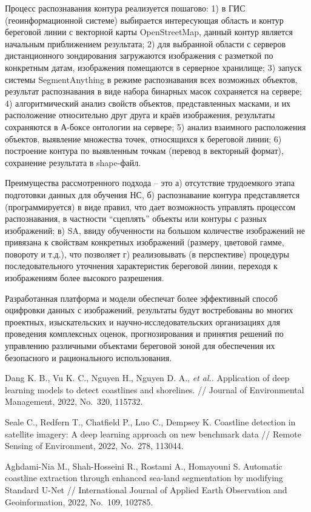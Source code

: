 Процесс распознавания контура реализуется пошагово: 1) в ГИС (геоинформационной системе) выбирается интересующая область и контур береговой линии с векторной карты OpenStreetMap, данный контур является начальным приближением результата; 2) для выбранной области с серверов дистанционного зондирования загружаются изображения с разметкой по конкретным датам, изображения помещаются в серверное хранилище; 3) запуск системы SegmentAnything в режиме распознавания всех возможных объектов, результат распознавания в виде набора бинарных масок сохраняется на сервере; 4) алгоритмический анализ свойств объектов, представленных масками, и их расположение относительно друг друга и краёв изображения, результаты сохраняются в А-боксе онтологии на сервере; 5) анализ взаимного расположения объектов, выявление множества точек, относящихся к береговой линии; 6) построение контура по выявленным точкам (перевод в векторный формат), сохранение результата в shape-файл.

Преимущества рассмотренного подхода -- это а) отсутствие трудоемкого этапа подготовки данных для обучения НС, б) распознавание контура представляется (программируется) в виде правил, что дает возможность управлять процессом распознавания, в частности “сцеплять” объекты или контуры с разных изображений; в) SA, ввиду обученности на большом количестве изображений не привязана к свойствам конкретных изображений (размеру, цветовой гамме, повороту и т.д.), что позволяет г) реализовывать (в перспективе) процедуры последовательного уточнения характеристик береговой линии, переходя к изображениям более высокого разрешения.

Разработанная платформа и модели обеспечат более эффективный способ оцифровки данных с изображений, результаты будут востребованы во многих проектных, изыскательских и научно-исследовательских организациях для проведения комплексных оценок, прогнозирования и принятия решений по управлению различными объектами береговой зоной для обеспечения их безопасного и рационального использования.


\begin{thebibliography}{9} %
 Dang K. B., Vu K. C., Nguyen H., Nguyen D. A., \emph{et al.}. Application of deep learning models to detect coastlines and shorelines. // Journal of Environmental Management, 2022, No.~320, 115732.

 Seale C., Redfern T., Chatfield P., Luo C., Dempsey K. Coastline detection in satellite imagery: A deep learning approach on new benchmark data // Remote Sensing of Environment, 2022, No.~278, 113044.

 Aghdami-Nia M., Shah-Hosseini R., Rostami A., Homayouni S. Automatic coastline extraction through enhanced sea-land segmentation by modifying Standard U-Net // International Journal of Applied Earth Observation and Geoinformation, 2022, No.~109, 102785.
\end{thebibliography}





%


